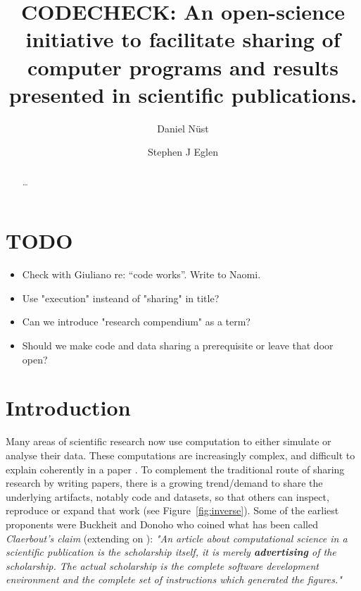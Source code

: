 \documentclass[12pt]{article}
\begin{document}
\title{CODECHECK: An open-science initiative to facilitate sharing of
  computer programs and results presented in scientific publications.}
\author[1,$\ast$]{Daniel N\"{u}st}
\author[2,$\ast$]{Stephen J Eglen}
\maketitle
\begin{abstract}
\ldots{}
\end{abstract}

\section*{TODO}\label{todo}

\begin{itemize}
\item Check with Giuliano re: ``code works''. Write to Naomi.
\item Use "execution" insteand of "sharing" in title?
\item Can we introduce "research compendium" as a term?
\item Should we make code and data sharing a prerequisite or leave that door open?
\end{itemize}

\section*{Introduction}\label{introduction}

Many areas of scientific research now use computation to either simulate
or analyse their data. These computations are increasingly complex, and
difficult to explain coherently in a paper \citep{marwick_how_2015}.
To complement the traditional route of sharing research by writing papers,
there is a growing trend/demand to share the underlying artifacts, notably 
code and datasets, so that others can inspect, reproduce or expand that work
(see Figure~\ref{fig:inverse}).
Some of the earliest proponents were Buckheit and Donoho
\cite{buckheit_wavelab_1995} who coined what has been called 
\emph{Claerbout's claim} (extending on \citet{claerbout_electronic_1992}):
\emph{"An article about computational science in a scientific publication 
is  the scholarship itself, it is merely \textbf{advertising} of
the scholarship. The actual scholarship is the complete software development
environment and the complete set of instructions which generated the 
figures."}
\end{document}
